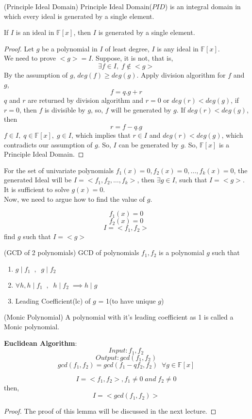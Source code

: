 \begin{definition}(Principle Ideal Domain)
Principle Ideal Domain($PID$) is an integral domain in which every ideal is generated by a single element.
\end{definition}
\begin{theorem}
If $I$ is an ideal in $\mathbb{F}[x]$, then $I$ is generated by a single element.
\end{theorem}
\begin{proof}
Let $g$ be a polynomial in $I$ of least degree, $I$ is any ideal in $\mathbb{F}[x]$.\\
We need to prove $<g>=I$. Suppose, it is not, that is, $$\exists f \in I,\; f \notin <g>$$
By the assumption of $g$, $deg(f)\geq deg(g)$. Apply division algorithm for $f$ and $g$, $$f=q.g+r$$
$q$ and $r$ are returned by division algorithm and $r=0$ or $deg(r)<deg(g)$, if $r=0$, then $f$ is divisible by $g$, so, $f$ will be generated by $g$. If $deg(r)<deg(g)$, then $$r = f-q.g$$ 
$ f\in I,\;q\in\mathbb{F}[x],\;g\in I$, which implies that $r\in I$ and $deg(r)<deg(g)$, which contradicts our assumption of $g$. So, $I$ can be generated by $g$. So, $\mathbb{F}[x]$ is a Principle Ideal Domain.
\end{proof}
For the set of univariate polynomials $f_1(x)=0,f_2(x)=0,\ldots,f_k(x)=0$, the generated Ideal will be $I=<f_1,f_2,\ldots,f_k>$, then $\exists g\in I$, such that $I=<g>$. It is sufficient to solve $g(x)=0$.\\
Now, we need to argue how to find the value of $g$.\\
\begin{problem}
$$f_1(x)=0$$
$$f_2(x)=0$$
$$I=<f_1,f_2>$$
find $g$ such that $I=<g>$
\end{problem}
\begin{definition}(GCD of 2 polynomials)
GCD of polynomials $f_1,f_2$ is a polynomial $g$ such that 
\begin{enumerate}
\item $g\;|\;f_1\;\;,\;\;g\;|\;f_2$
\item $\forall h, h\;|\;f_1\;\;,\;\;h\;|\;f_2\;\implies h\;|\;g$
\item Leading Coefficient(lc) of $g$ = 1(to have unique $g$)
\end{enumerate}
\end{definition}
\begin{definition}(Monic Polynomial)
A polynomial with it's leading coefficient as 1 is called a Monic polynomial.
\end{definition}
\textbf{Euclidean Algorithm}:\\
$$Input:f_1,f_2$$
$$Output: gcd(f_1,f_2)$$
$$gcd(f_1, f_2) = gcd(f_1-qf_2,f_2)\;\;\forall g \in \mathbb{F}[x]$$
\begin{lemma}
$$I = <f_1, f_2>, f_1 \neq 0\;and\;f_2\neq 0$$
then,$$I=<gcd(f_1,f_2)>$$
\end{lemma}
\begin{proof}
The proof of this lemma will be discussed in the next lecture.
\end{proof}
